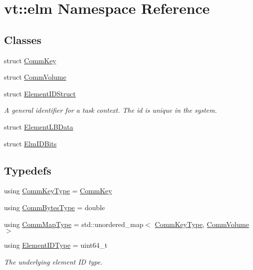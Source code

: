 \hypertarget{namespacevt_1_1elm}{}\section{vt\+:\+:elm Namespace Reference}
\label{namespacevt_1_1elm}
\subsection*{Classes}
\begin{DoxyCompactItemize}
\item 
struct \hyperlink{structvt_1_1elm_1_1_comm_key}{Comm\+Key}
\item 
struct \hyperlink{structvt_1_1elm_1_1_comm_volume}{Comm\+Volume}
\item 
struct \hyperlink{structvt_1_1elm_1_1_element_i_d_struct}{Element\+I\+D\+Struct}
\begin{DoxyCompactList}\small\item\em A general identifier for a task context. The {\ttfamily id} is unique in the system. \end{DoxyCompactList}\item 
struct \hyperlink{structvt_1_1elm_1_1_element_l_b_data}{Element\+L\+B\+Data}
\item 
struct \hyperlink{structvt_1_1elm_1_1_elm_i_d_bits}{Elm\+I\+D\+Bits}
\end{DoxyCompactItemize}
\subsection*{Typedefs}
\begin{DoxyCompactItemize}
\item 
using \hyperlink{namespacevt_1_1elm_a89067ebf8407548591583dd2f60b53b5}{Comm\+Key\+Type} = \hyperlink{structvt_1_1elm_1_1_comm_key}{Comm\+Key}
\item 
using \hyperlink{namespacevt_1_1elm_a6005d029f0531d2809076ce7186416bf}{Comm\+Bytes\+Type} = double
\item 
using \hyperlink{namespacevt_1_1elm_a38487cb8896b9b4763efa9022fab560e}{Comm\+Map\+Type} = std\+::unordered\+\_\+map$<$ \hyperlink{namespacevt_1_1elm_a89067ebf8407548591583dd2f60b53b5}{Comm\+Key\+Type}, \hyperlink{structvt_1_1elm_1_1_comm_volume}{Comm\+Volume} $>$
\item 
using \hyperlink{namespacevt_1_1elm_a63afb64985b41b7b6dcf2f01336391f8}{Element\+I\+D\+Type} = uint64\+\_\+t
\begin{DoxyCompactList}\small\item\em The underlying element ID type. \end{DoxyCompactList}\end{DoxyCompactItemize}
